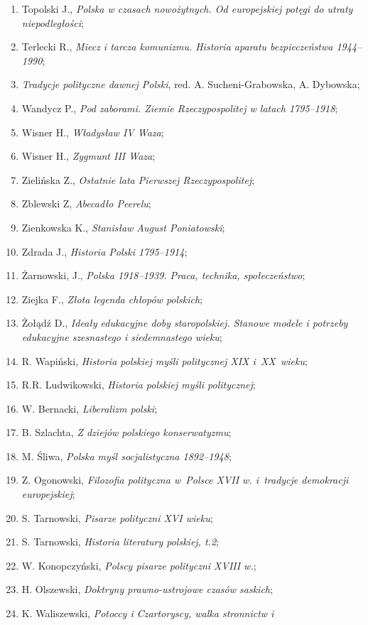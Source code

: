 \documentclass[a4paper,11pt]{article}
\begin{document}
\begin{enumerate}
\item Topolski J., \emph{Polska w czasach nowożytnych. Od europejskiej
    potęgi do utraty niepodległości};
\item Terlecki R., \emph{Miecz i tarcza komunizmu. Historia aparatu
    bezpieczeństwa 1944--1990};
\item \emph{Tradycje polityczne dawnej Polski}, red. A.
  Sucheni-Grabowska, A. Dybowska;
\item Wandycz P., \emph{Pod zaborami. Ziemie Rzeczypospolitej w latach
    1795--1918};
\item Wisner H., \emph{Władysław IV Waza};
\item Wisner H., \emph{Zygmunt III Waza};
\item Zielińska Z., \emph{Ostatnie lata Pierwszej Rzeczypospolitej};
\item Zblewski Z, \emph{Abecadło Peerelu};
\item Zienkowska K., \emph{Stanisław August Poniatowski};
\item Zdrada J., \emph{Historia Polski 1795--1914};
\item Żarnowski, J., \emph{Polska 1918--1939. Praca, technika,
    społeczeństwo};
\item Ziejka F., \emph{Złota legenda chłopów polskich};
\item Żołądź D., \emph{Ideały edukacyjne doby staropolskiej. Stanowe
    modele i potrzeby edukacyjne szesnastego i siedemnastego wieku};
\item R. Wapiński, \emph{Historia polskiej myśli politycznej XIX
    i~XX~wieku};
\item R.R. Ludwikowski, \emph{Historia polskiej myśli politycznej};
\item W. Bernacki, \emph{Liberalizm polski};
\item B. Szlachta, \emph{Z dziejów polskiego konserwatyzmu};
\item M. Śliwa, \emph{Polska myśl socjalistyczna 1892--1948};
\item Z. Ogonowski, \emph{Filozofia polityczna w~Polsce XVII w.
    i~tradycje demokracji europejskiej};
\item S. Tarnowski, \emph{Pisarze polityczni XVI wieku};
\item S. Tarnowski, \emph{Historia literatury polskiej, t.2};
\item W. Konopczyński, \emph{Polscy pisarze polityczni XVIII w.};
\item H. Olszewski, \emph{Doktryny prawno-ustrojowe czasów saskich};
\item K. Waliszewski, \emph{Potoccy i Czartoryscy, walka stronnictw i
}
\end{enumerate}
\end{document}
